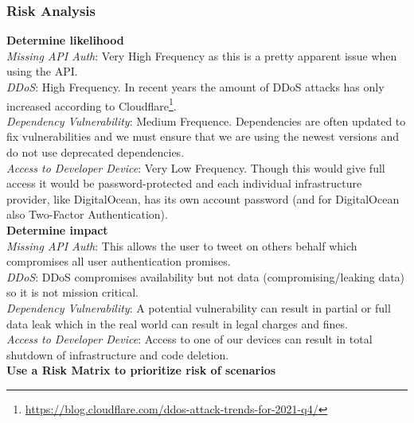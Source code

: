 \subsubsection*{Risk Analysis}
\textbf{Determine likelihood}
\\
\textit{Missing API Auth}: Very High Frequency as this is a pretty apparent issue when using the API.\\
\textit{DDoS}: High Frequency. In recent years the amount of DDoS attacks has only increased according to Cloudflare\footnote{\url{https://blog.cloudflare.com/ddos-attack-trends-for-2021-q4/}}.\\
\textit{Dependency Vulnerability}: Medium Frequence. Dependencies are often updated to fix vulnerabilities and we must ensure that we are using the newest versions and do not use deprecated dependencies.\\
\textit{Access to Developer Device}: Very Low Frequency. Though this would give full access it would be password-protected and each individual infrastructure provider, like DigitalOcean, has its own account password (and for DigitalOcean also Two-Factor Authentication).\\
\textbf{Determine impact}\\
\textit{Missing API Auth}: This allows the user to tweet on others behalf which compromises all user authentication promises.\\
\textit{DDoS}: DDoS compromises availability but not data (compromising/leaking data) so it is not mission critical.\\
\textit{Dependency Vulnerability}: A potential vulnerability can result in partial or full data leak which in the real world can result in legal charges and fines. \\
\textit{Access to Developer Device}: Access to one of our devices can result in total shutdown of infrastructure and code deletion.\\
\textbf{Use a Risk Matrix to prioritize risk of scenarios}\\
